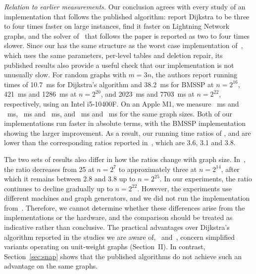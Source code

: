 \emph{Relation to earlier measurements.} Our conclusion agrees with every study of an
implementation that follows the published algorithm: \cite{castro2025} report Dijkstra to be
three to four times faster on large instances, \cite{valko2025} find it faster on Lightning
Network graphs, and the solver of~\cite{ryu2025} that follows the paper is reported as two to
four times slower. Since our \bmA{} has the same structure as the worst case implementation
of~\cite{castro2025}, which uses the same parameters, per-level tables and deletion repair, its
published results also provide a useful check that our implementation is not unusually slow. For
random graphs with $m=3n$, the authors report running times of 10.7~ms for Dijkstra's algorithm and
38.2~ms for BMSSP at $n=2^{16}$, 421~ms and 1286~ms at $n=2^{20}$, and 2023~ms and 7703~ms at
$n=2^{22}$, respectively, using an Intel i5-10400F. On an Apple M1, we measure \MsSixteenDij~ms and
\MsSixteenTwoFive~ms, \MsTwentyDij~ms and \MsTwentyTwoFive~ms, and \MsTwentyTwoDij~ms and
\MsTwentyTwoTwoFive~ms for the same graph sizes. Both of our implementations run faster in absolute
terms, with the BMSSP implementation showing the larger improvement. As a result, our running time
ratios of \RatioRandSixteenTwoFive, \RatioRandTwentyTwoFive{} and \RatioRandTwentyTwoTwoFive{} are
lower than the corresponding ratios reported in~\cite{castro2025}, which are 3.6, 3.1 and 3.8.

The two sets of results also differ in how the ratios change with graph size. In~\cite{castro2025},
the ratio decreases from 25 at $n=2^{7}$ to approximately three at $n=2^{14}$, after which it
remains between 2.8 and 3.8 up to $n=2^{25}$. In our experiments, the ratio continues to decline
gradually up to $n=2^{22}$. However, the experiments use different machines and graph generators,
and we did not run the implementation from~\cite{castro2025}. Therefore, we cannot determine whether
these differences arise from the implementations or the hardware, and the comparison should be
treated as indicative rather than conclusive. The practical advantages over Dijkstra's algorithm
reported in the studies we are aware of,~\cite{ryu2025} and~\cite{webb2025}, concern simplified
variants operating on unit-weight graphs (Section~II). In contrast, Section~\ref{sec:snap} shows
that the published algorithms do not achieve such an advantage on the same graphs.

